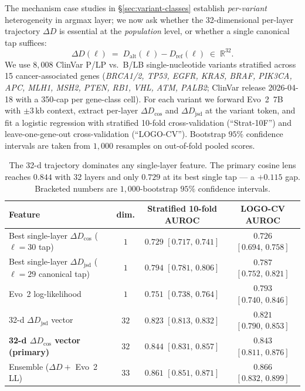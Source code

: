 \documentclass[12pt]{article}
\renewenvironment{table*}{\begin{table}}{\end{table}}
\theoremstyle{plain}
\theoremstyle{definition}
\theoremstyle{remark}
\newcommand{\DDcos}{\Delta D_{\cos}}
\newcommand{\DDjsd}{\Delta D_{\mathrm{jsd}}}
\begin{document}
The mechanism case studies in \S\ref{sec:variant-classes} establish
\emph{per-variant} heterogeneity in argmax layer; we now ask whether
the 32-dimensional per-layer trajectory $\Delta D$ is essential at the
\emph{population} level, or whether a single canonical tap suffices:
\begin{equation}
  \Delta D(\ell) \;=\; D_{\mathrm{alt}}(\ell) - D_{\mathrm{ref}}(\ell)
  \;\in\;\mathbb{R}^{32}.
  \label{eq:DD}
\end{equation}
We use $8{,}008$ ClinVar P/LP vs.\ B/LB single-nucleotide variants
stratified across 15 cancer-associated genes (\emph{BRCA1/2, TP53,
EGFR, KRAS, BRAF, PIK3CA, APC, MLH1, MSH2, PTEN, RB1, VHL, ATM, PALB2};
ClinVar release 2026-04-18 with a 350-cap per gene-class cell). For
each variant we forward Evo~2~7B with $\pm 3$\,kb context, extract
per-layer $\DDcos$ and $\DDjsd$ at the variant token, and fit a
logistic regression with stratified 10-fold cross-validation
(``Strat-10F'') and leave-one-gene-out cross-validation (``LOGO-CV'').
Bootstrap $95\%$ confidence intervals are taken from $1{,}000$
resamples on out-of-fold pooled scores.

\begin{table}[t]
\caption{The 32-d trajectory dominates any single-layer feature. The
primary cosine lens reaches $0.844$ with 32 layers and only $0.729$ at
its best single tap --- a $+0.115$ gap. Bracketed numbers are
$1{,}000$-bootstrap $95\%$ confidence intervals.}
\label{tab:auroc}
\centering
\small
\begin{tabular}{@{}lccc@{}}
\toprule
Feature & dim. & Stratified 10-fold AUROC & LOGO-CV AUROC \\
\midrule
Best single-layer $\DDcos$ ($\ell=30$ tap) & $1$
   & $0.729$ $[0.717,\, 0.741]$
   & $0.726$ $[0.694,\, 0.758]$ \\
Best single-layer $\DDjsd$ ($\ell=29$ canonical tap) & $1$
   & $0.794$ $[0.781,\, 0.806]$
   & $0.787$ $[0.752,\, 0.821]$ \\
Evo~2 log-likelihood & $1$
   & $0.751$ $[0.738,\, 0.764]$
   & $0.793$ $[0.740,\, 0.846]$ \\
32-d $\DDjsd$ vector & $32$
   & $0.823$ $[0.813,\, 0.832]$
   & $0.821$ $[0.790,\, 0.853]$ \\
\textbf{32-d $\DDcos$ vector (primary)} & $32$
   & $\mathbf{0.844}$ $[0.831,\, 0.857]$
   & $\mathbf{0.843}$ $[0.811,\, 0.876]$ \\
Ensemble ($\Delta D + $ Evo~2 LL) & $33$
   & $0.861$ $[0.851,\, 0.871]$
   & $0.866$ $[0.832,\, 0.899]$ \\
\bottomrule
\end{tabular}
\end{table}
\end{document}
